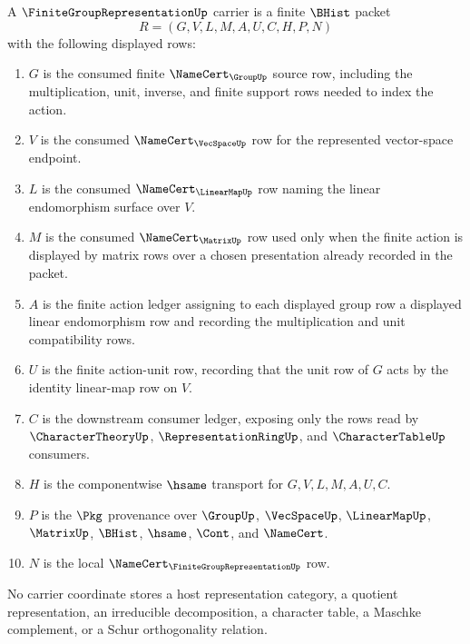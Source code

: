 \begin{definition}
\label{def:finite-group-representation-carrier}
A $\FiniteGroupRepresentationUp$ carrier is a finite $\BHist$ packet
$$
R=(G,V,L,M,A,U,C,H,P,N)
$$
with the following displayed rows:
\begin{enumerate}
\item $G$ is the consumed finite $\NameCert_{\GroupUp}$ source row, including the multiplication, unit, inverse, and finite support rows needed to index the action.
\item $V$ is the consumed $\NameCert_{\VecSpaceUp}$ row for the represented vector-space endpoint.
\item $L$ is the consumed $\NameCert_{\LinearMapUp}$ row naming the linear endomorphism surface over $V$.
\item $M$ is the consumed $\NameCert_{\MatrixUp}$ row used only when the finite action is displayed by matrix rows over a chosen presentation already recorded in the packet.
\item $A$ is the finite action ledger assigning to each displayed group row a displayed linear endomorphism row and recording the multiplication and unit compatibility rows.
\item $U$ is the finite action-unit row, recording that the unit row of $G$ acts by the identity linear-map row on $V$.
\item $C$ is the downstream consumer ledger, exposing only the rows read by $\CharacterTheoryUp$, $\RepresentationRingUp$, and $\CharacterTableUp$ consumers.
\item $H$ is the componentwise $\hsame$ transport for $G,V,L,M,A,U,C$.
\item $P$ is the $\Pkg$ provenance over $\GroupUp$, $\VecSpaceUp$, $\LinearMapUp$, $\MatrixUp$, $\BHist$, $\hsame$, $\Cont$, and $\NameCert$.
\item $N$ is the local $\NameCert_{\FiniteGroupRepresentationUp}$ row.
\end{enumerate}
No carrier coordinate stores a host representation category, a quotient representation, an irreducible decomposition, a character table, a Maschke complement, or a Schur orthogonality relation.
\end{definition}

